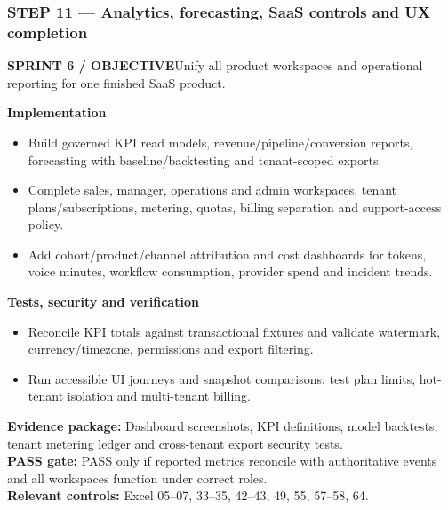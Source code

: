 \documentclass[10.5pt,a4paper,oneside]{article}
\newcommand{\eyebrow}[1]{{\sffamily\footnotesize\bfseries\color{gold}\MakeUppercase{#1}}}
\begin{document}
\subsubsection*{STEP 11 --- Analytics, forecasting, SaaS controls and UX completion}
\eyebrow{Sprint 6 / objective}\quad Unify all product workspaces and operational reporting for one finished SaaS product.
\begin{tcolorbox}[colback=warm,colframe=line,boxrule=.45pt,arc=2pt,left=8pt,right=8pt,top=6pt,bottom=6pt]\textbf{Implementation}
\begin{itemize}
\item Build governed KPI read models, revenue/pipeline/conversion reports, forecasting with baseline/backtesting and tenant-scoped exports.
\item Complete sales, manager, operations and admin workspaces, tenant plans/subscriptions, metering, quotas, billing separation and support-access policy.
\item Add cohort/product/channel attribution and cost dashboards for tokens, voice minutes, workflow consumption, provider spend and incident trends.
\end{itemize}
\textbf{Tests, security and verification}
\begin{itemize}
\item Reconcile KPI totals against transactional fixtures and validate watermark, currency/timezone, permissions and export filtering.
\item Run accessible UI journeys and snapshot comparisons; test plan limits, hot-tenant isolation and multi-tenant billing.
\end{itemize}
\textbf{Evidence package:} Dashboard screenshots, KPI definitions, model backtests, tenant metering ledger and cross-tenant export security tests.\\
\textbf{PASS gate:} PASS only if reported metrics reconcile with authoritative events and all workspaces function under correct roles.\\
\textbf{Relevant controls:} Excel 05--07, 33--35, 42--43, 49, 55, 57--58, 64.
\end{tcolorbox}
\Needspace{100mm}
\end{document}
